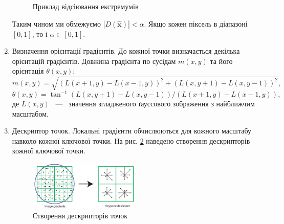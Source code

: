 \begin{enumerate}
          \begin{figure}[H]
              \centering
              \caption{Приклад відсіювання екстремумів \cite{bib:sift}
                  \label{fig:filtering_extremum}
              }
          \end{figure}
          Таким чином  ми обмежуємо $|D(\widehat{\boldsymbol{x}})| < \alpha$.
          Якщо кожен піксель в діапазоні $[0,1]$, то і
          $ \alpha \in [0,1]$.
    \item Визначення орієнтації градієнтів.
          До кожної точки визначається декілька орієнтацій градієнтів.
          Довжина градієнта по сусідам $m(x,y)$ та його орієнтація $\theta(x,y)$:
          \begin{equation*}
              m(x,y) = \sqrt{(L(x+1,y) - L(x-1,y))^2 + (L(x,y+1) - L(x,y-1))^2},
          \end{equation*}
          \begin{equation*}
              \theta(x,y) = \tan^{-1} (L(x,y+1) - L(x,y-1))/(L(x+1,y) - L(x-1,y)),
          \end{equation*}
          де $L(x,y)$ ~---~ значення згладженого ґауссового зображення з найближчим масштабом.

    \item Дескриптор точок.
          Локальні градієнти обчислюються для кожного масштабу навколо кожної ключової точки.
          На рис. \ref{fig:swift6} наведено створення дескрипторів кожної ключової точки.
          \begin{figure}[H]
              \centering
              \includegraphics[width=0.5\textwidth]{images/sift6}
              \caption{Створення дескрипторів точок \cite{bib:sift}
                  \label{fig:swift6}
              }
          \end{figure}
\end{enumerate}

